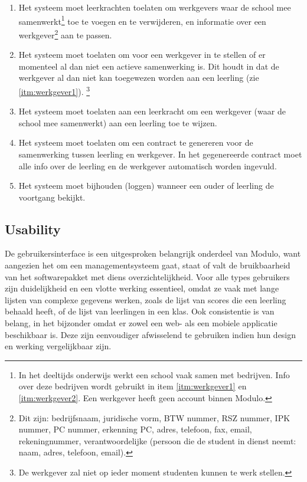 \documentclass[a4paper]{article}
\begin{document}
\begin{enumerate}[label=F\arabic*]
\item \label{itm:werkgever_info} Het systeem moet leerkrachten toelaten om werkgevers waar de school mee samenwerkt\footnote{In het deeltijds onderwijs werkt een school vaak samen met bedrijven. Info over deze bedrijven wordt gebruikt in item \ref{itm:werkgever1} en \ref{itm:werkgever2}. Een werkgever heeft geen account binnen Modulo.} toe te voegen en te verwijderen, en informatie over een werkgever\footnote{Dit zijn: bedrijfsnaam, juridische vorm, BTW nummer, RSZ nummer, IPK nummer, PC nummer, erkenning PC, adres, telefoon, fax, email, rekeningnummer, verantwoordelijke (persoon die de student in dienst neemt: naam, adres, telefoon, email).} aan te passen.
\item Het systeem moet toelaten om voor een werkgever in te stellen of er momenteel al dan niet een actieve samenwerking is. Dit houdt in dat de werkgever al dan niet kan toegewezen worden aan een leerling (zie \ref{itm:werkgever1}). \footnote{De werkgever zal niet op ieder moment studenten kunnen te werk stellen.}
\item \label{itm:werkgever1} Het systeem moet toelaten aan een leerkracht om een werkgever (waar de school mee samenwerkt) aan een leerling toe te wijzen.
\item \label{itm:werkgever2} Het systeem moet toelaten om een contract te genereren voor de samenwerking tussen leerling en werkgever. In het gegenereerde contract moet alle info over de leerling en de werkgever automatisch worden ingevuld.
\item Het systeem moet bijhouden (loggen) wanneer een ouder of leerling de voortgang bekijkt.
\end{enumerate}



\subsection{Usability}
De gebruikersinterface is een uitgesproken belangrijk onderdeel van Modulo, want aangezien het om een managementsysteem gaat, staat of valt de bruikbaarheid van het softwarepakket met diens overzichtelijkheid. Voor alle types gebruikers zijn duidelijkheid en een vlotte werking essentieel, omdat ze vaak met lange lijsten van complexe gegevens werken, zoals de lijst van scores die een leerling behaald heeft, of de lijst van leerlingen in een klas. Ook consistentie is van belang, in het bijzonder omdat er zowel een web- als een mobiele applicatie beschikbaar is. Deze zijn eenvoudiger afwisselend te gebruiken indien hun design en werking vergelijkbaar zijn.
\end{document}
